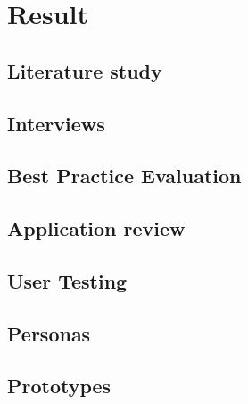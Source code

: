\chapter{Result}
\label{chap:result}

\section{Literature study}
%
\section{Interviews}
%
\section{Best Practice Evaluation}
%
\section{Application review}
%
\section{User Testing}
%
\section{Personas}
%
\section{Prototypes}
%
